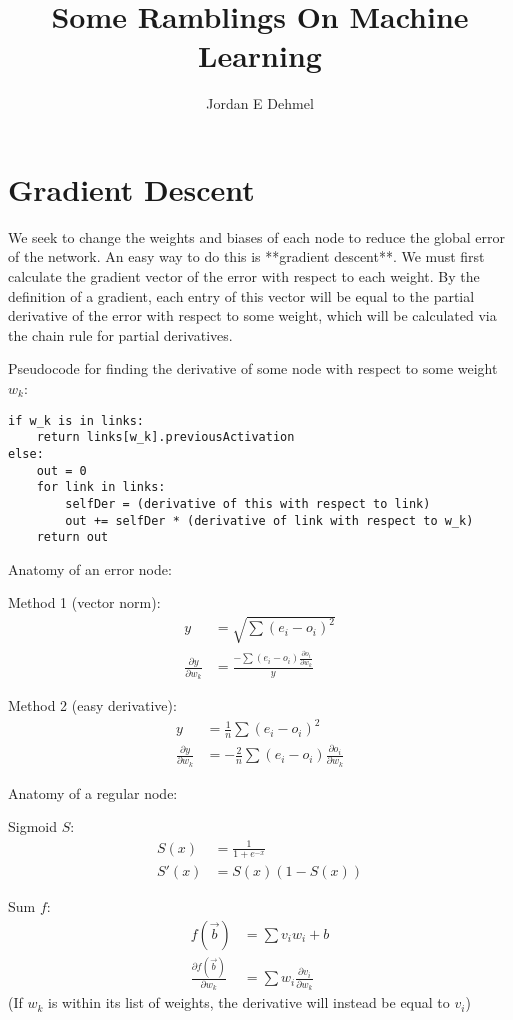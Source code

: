 \documentclass[8pt]{amsart}
\title{Some Ramblings On Machine Learning}
\author{Jordan E Dehmel}
\begin{document}
\maketitle

\section{Gradient Descent}

We seek to change the weights and biases of each node to reduce the
global error of the network. An easy way to do this is **gradient descent**.
We must first calculate the gradient vector of the error with respect to
each weight. By the definition of a gradient, each entry of this vector will
be equal to the partial derivative of the error with respect to some weight,
which will be calculated via the chain rule for partial derivatives.

Pseudocode for finding the derivative of some node with respect to
some weight $w_k$:
\begin{verbatim}
if w_k is in links:
    return links[w_k].previousActivation
else:
    out = 0
    for link in links:
        selfDer = (derivative of this with respect to link)
        out += selfDer * (derivative of link with respect to w_k)
    return out
\end{verbatim}

Anatomy of an error node:

Method 1 (vector norm):
$$
\begin{aligned}
    y &= \sqrt{\sum{(e_i - o_i)^2}} \\
    \frac{\partial y}{\partial w_k} &= \frac{-\sum{(e_i - o_i)\frac{\partial o_i}{\partial w_k}}}{y}
\end{aligned}
$$

Method 2 (easy derivative):
$$
\begin{aligned}
    y &= \frac{1}{n} \sum{(e_i - o_i)^2} \\
    \frac{\partial y}{\partial w_k} &= - \frac{2}{n} \sum{(e_i - o_i) \frac{\partial o_i}{\partial w_k}}
\end{aligned}
$$

Anatomy of a regular node:

Sigmoid $S$:
$$
\begin{aligned}
    S(x) &= \frac{1}{1 + e^{-x}} \\
    S'(x) &= S(x) (1 - S(x))
\end{aligned}
$$

Sum $f$:
$$
\begin{aligned}
    f(\vec{b}) &= \sum{v_i w_i} + b \\
    \frac{\partial f(\vec{b})}{\partial w_k} &= \sum{w_i \frac{\partial v_i}{\partial w_k}}
\end{aligned}
$$
(If $w_k$ is within its list of weights, the derivative will instead be equal to $v_i$)
\end{document}
